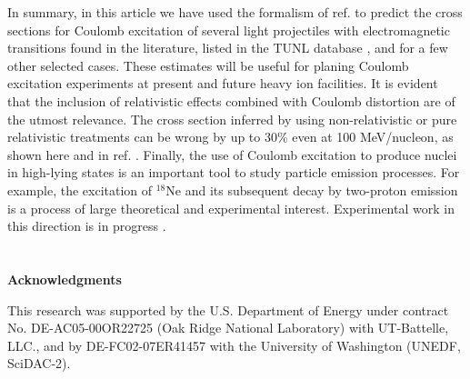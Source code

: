 \documentclass[prc,preprint,showpacs,showkeys,nofootinbib]{revtex4}%
\begin{document}
In summary, in this article we have used the formalism of ref.
\cite{Ber03} to predict the cross sections for Coulomb excitation of
several light projectiles with electromagnetic transitions found in
the literature, listed in the TUNL database \cite{tunl}, and for a
few other selected cases. These estimates will be useful for planing
Coulomb excitation experiments at present and future heavy ion
facilities. It is evident that the inclusion of relativistic effects
combined with Coulomb distortion are of the utmost relevance. The cross section inferred by using
non-relativistic or pure relativistic treatments can be wrong by up
to 30\% even at 100 MeV/nucleon, as shown here and in ref.
\cite{Ber03}. Finally, the use of Coulomb excitation to produce
nuclei in high-lying states is an important tool to study particle
emission processes. For example, the excitation of $^{18}$Ne and its
subsequent decay by two-proton emission is a process of large
theoretical and experimental interest. Experimental work in this
direction is in progress \cite{Ra06}.

\section*{\bigskip}

\bigskip

\textbf{Acknowledgments}

This research was supported by the U.S. Department of Energy under contract
No. DE-AC05-00OR22725 (Oak Ridge National Laboratory) with UT-Battelle, LLC.,
and by DE-FC02-07ER41457 with the University of Washington (UNEDF, SciDAC-2).
\end{document}
